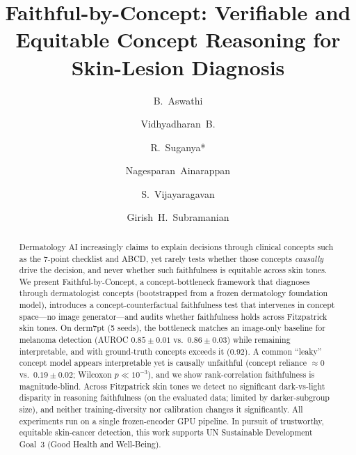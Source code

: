 \documentclass{svproc}
\begin{document}
\mainmatter
%
\title{Faithful-by-Concept: Verifiable and Equitable Concept Reasoning for Skin-Lesion Diagnosis}
%
%
\author{B.~Aswathi \and Vidhyadharan~B. \and R.~Suganya* \and
Nagesparan~Ainarappan  \and S.~Vijayaragavan \and
Girish~H.~Subramanian}
%
%
%

\maketitle
%
\begin{abstract}
Dermatology AI increasingly claims to explain decisions through clinical concepts
such as the 7-point checklist and ABCD, yet rarely tests whether those concepts
\emph{causally} drive the decision, and never whether such faithfulness is equitable
across skin tones. We present Faithful-by-Concept, a concept-bottleneck framework
that diagnoses through dermatologist concepts (bootstrapped from a frozen dermatology
foundation model), introduces a concept-counterfactual faithfulness test that
intervenes in concept space---no image generator---and audits whether faithfulness
holds across Fitzpatrick skin tones. On derm7pt (5 seeds), the bottleneck matches an
image-only baseline for melanoma detection (AUROC $0.85\pm0.01$ vs.\ $0.86\pm0.03$)
while remaining interpretable, and with ground-truth concepts exceeds it ($0.92$).
A common ``leaky'' concept model appears interpretable yet is causally unfaithful
(concept reliance $\approx 0$ vs.\ $0.19\pm0.02$; Wilcoxon $p\ll10^{-3}$), and we show
rank-correlation faithfulness is magnitude-blind. Across Fitzpatrick skin tones we
detect no significant dark-vs-light disparity in reasoning faithfulness (on the
evaluated data; limited by darker-subgroup size), and neither training-diversity nor
calibration changes it significantly. All experiments run on a single frozen-encoder
GPU pipeline. In pursuit of trustworthy, equitable skin-cancer detection, this work
supports UN Sustainable Development Goal~3 (Good Health and Well-Being).
\end{abstract}
%
\end{document}
